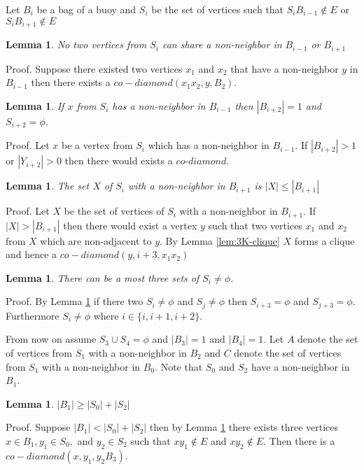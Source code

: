 \documentclass[12pt]{article}
\newtheorem{Lemma}[Theorem]{Lemma}
\begin{document}
Let $B_i$ be a bag of a buoy and $S_i$ be the set of vertices such that $S_iB_{i-1} \not \in E$ or $S_iB_{i+1} \not \in E$


\begin{Lemma}\label{lem:si-no-share-vertex}
No two vertices from $S_i$ can share a non-neighbor in $B_{i-1}$ or $B_{i+1}$
\end{Lemma}
\noindent {\it} Proof. Suppose there existed two vertices $x_1$ and $x_2$ that have a non-neighbor $y$ in $B_{i-1}$ then there exists a $co-diamond (x_1x_2, y, B_2)$.

\begin{Lemma}\label{lem:3-si-limit}
If $x$ from $S_i$ has a non-neighbor in $B_{i-1}$ then $|B_{i+2}| = 1$ and $S_{i+2} = \phi$.  
\end{Lemma}
\noindent {\it} Proof. Let $x$ be a vertex from $S_i$ which has a non-neighbor in $B_{i-1}$. If $|B_{i+2}| > 1$ or  $|Y_{i+2}| > 0$  then there would exists a $co$-$diamond$.

\begin{Lemma}\label{lem:si-limit}
The set $X$ of $S_i$ with a non-neighbor in $B_{i+1}$ is $|X| \leq |B_{i+1}|$ 
\end{Lemma}
\noindent {\it} Proof. Let $X$ be the set of vertices of $S_i$ with a non-neighbor in $B_{i+1}$. If $|X| > |B_{i+1}|$ then there would exist a vertex $y$ such that two vertices $x_1$ and $x_2$ from $X$ which are non-adjacent to $y$. By Lemma \ref{lem:3K-clique} $X$ forms a clique and hence a $co-diamond (y, i+3, x_1x_2)$

\begin{Lemma}\label{lem:max-3-si}
There can be a most three sets of $S_i \neq \phi$. 
\end{Lemma}
\noindent {\it} Proof. By Lemma \ref{lem:3-si-limit} if there two $S_i \neq \phi$ and $S_j \neq \phi$ then  $S_{i+3} = \phi$ and $S_{j+3} = \phi$. Furthermore $S_i \neq \phi$ where $i \in \{i, i+1, i+2\}$. 

From now on assume $S_3 \cup S_4 = \phi$ and $|B_3| = 1$ and $|B_4| = 1$. Let $A$ denote the set of vertices from $S_1$ with a non-neighbor in $B_2$ and $C$ denote the set of vertices from $S_1$ with a non-neighbor in $B_0$. Note that $S_0$ and $S_2$ have a non-neighbor in $B_1$.

\begin{Lemma}\label{lem:max-s0-s2}
$|B_1| \geq |S_0| + |S_2|$
\end{Lemma}
\noindent {\it} Proof. Suppose $|B_1| < |S_0| + |S_2|$ then by Lemma \ref{lem:si-no-share-vertex} there exists three vertices $x \in B_1, y_1 \in S_0,$ and $y_2 \in S_2$ such that $xy_1 \not \in E$ and $xy_2 \not \in E$. Then there is a $co-diamond (x, y_1, y_2B_3)$.
\end{document}
